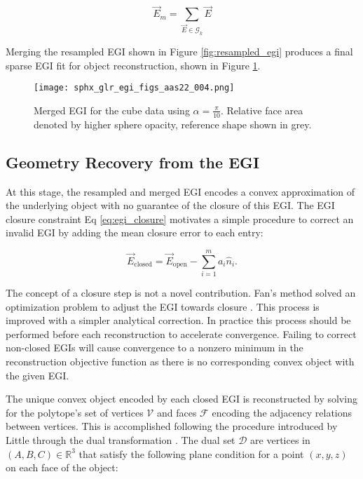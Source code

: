 \begin{equation} \label{eq:fixing_egi}
  \vec{E}_m = \sum_{\vec{E} \in \mathcal{G}_k}{\vec{E}}
\end{equation}

Merging the resampled EGI shown in Figure \ref{fig:resampled_egi} produces a final sparse EGI fit for object reconstruction, shown in Figure \ref{fig:merged_egi}. 

\begin{figure}[!htb]
  \centering
  \texttt{[image: sphx\_glr\_egi\_figs\_aas22\_004.png]}
  \caption{Merged EGI for the cube data using $\alpha = \frac{\pi}{10}$. Relative face area denoted by higher sphere opacity, reference shape shown in grey.}
  \label{fig:merged_egi}
\end{figure}

\subsection{Geometry Recovery from the EGI}

At this stage, the resampled and merged EGI encodes a convex approximation of the underlying object with no guarantee of the closure of this EGI. The EGI closure constraint Eq \ref{eq:egi_closure} motivates a simple procedure to correct an invalid EGI by adding the mean closure error to each entry:

\begin{equation} \label{eq:egi_validation}
  \vec{E}_{\textrm{closed}} = \vec{E}_{\textrm{open}} - \sum_{i=1}^m a_i \hat{n}_i .
\end{equation}

The concept of a closure step is not a novel contribution. Fan's method solved an optimization problem to adjust the EGI towards closure \cite{fan2020thesis}. This process is improved with a simpler analytical correction. In practice this process should be performed before each reconstruction to accelerate convergence. Failing to correct non-closed EGIs will cause convergence to a nonzero minimum in the reconstruction objective function as there is no corresponding convex object with the given EGI.

The unique convex object encoded by each closed EGI is reconstructed by solving for the polytope's set of vertices $\mathcal{V}$ and faces $\mathcal{F}$ encoding the adjacency relations between vertices. This is accomplished following the procedure introduced by Little through the dual transformation \cite{little1983}. The dual set $\mathcal{D}$ are vertices in $(A, B, C) \in \mathbb{R}^3$ that satisfy the following plane condition for a point $(x, y, z)$ on each face of the object:

